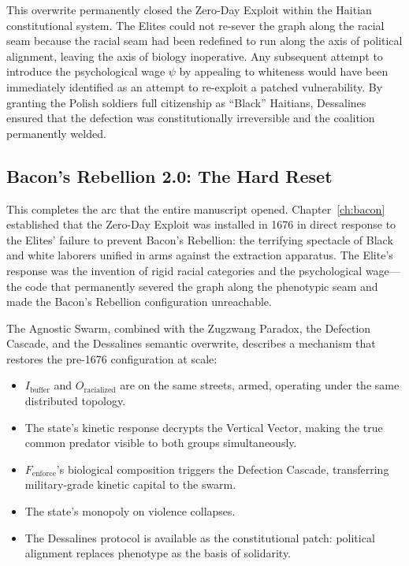 This overwrite permanently closed the Zero-Day Exploit within the Haitian constitutional system. The Elites could not re-sever the graph along the racial seam because the racial seam had been redefined to run along the axis of political alignment, leaving the axis of biology inoperative. Any subsequent attempt to introduce the psychological wage $\psi$ by appealing to whiteness would have been immediately identified as an attempt to re-exploit a patched vulnerability. By granting the Polish soldiers full citizenship as ``Black'' Haitians, Dessalines ensured that the defection was constitutionally irreversible and the coalition permanently welded.

\subsection{Bacon's Rebellion 2.0: The Hard Reset}
\label{subsec:bacons_rebellion_2}

This completes the arc that the entire manuscript opened. Chapter~\ref{ch:bacon} established that the Zero-Day Exploit was installed in 1676 in direct response to the Elites' failure to prevent Bacon's Rebellion: the terrifying spectacle of Black and white laborers unified in arms against the extraction apparatus. The Elite's response was the invention of rigid racial categories and the psychological wage---the code that permanently severed the graph along the phenotypic seam and made the Bacon's Rebellion configuration unreachable.

The Agnostic Swarm, combined with the Zugzwang Paradox, the Defection Cascade, and the Dessalines semantic overwrite, describes a mechanism that restores the pre-1676 configuration at scale:

\begin{itemize}
    \item $I_{\text{buffer}}$ and $O_{\text{racialized}}$ are on the same streets, armed, operating under the same distributed topology.
    \item The state's kinetic response decrypts the Vertical Vector, making the true common predator visible to both groups simultaneously.
    \item $F_{\text{enforce}}$'s biological composition triggers the Defection Cascade, transferring military-grade kinetic capital to the swarm.
    \item The state's monopoly on violence collapses.
    \item The Dessalines protocol is available as the constitutional patch: political alignment replaces phenotype as the basis of solidarity.
\end{itemize}

